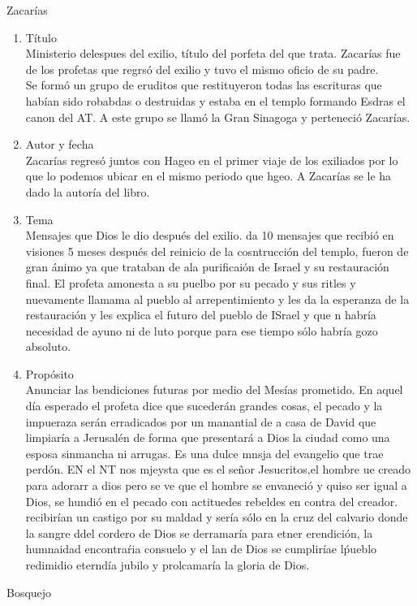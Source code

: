 \documentclass[12pt]{article}
\begin{document}
\begin{section}{Zacarías}
	\begin{enumerate}
		\item Título\\
			Ministerio delespues del exilio, título del porfeta del que trata. Zacarías fue de los profetas que regrsó del exilio y tuvo el mismo oficio de su padre.\\
			Se formó un grupo de eruditos que restituyeron todas las escrituras que habían sido robabdas o destruidas y estaba en el templo formando Esdras el canon del AT. A este grupo se llamó la Gran Sinagoga y perteneció Zacarías.
		\item Autor y fecha\\
			Zacarías regresó juntos con Hageo en el primer viaje de los exiliados por lo que lo podemos ubicar en el mismo periodo que hgeo. A Zacarías se le ha dado la autoría del libro.
		\item Tema\\
			Mensajes que Dios le dio después del exilio. da 10 mensajes que recibió en visiones 5 meses después del reinicio de la cosntrucción del templo, fueron de gran ánimo ya que trataban de ala purificaión de Israel y su restauración final. El profeta amonesta a su puelbo por su pecado y sus ritles y nuevamente llamama al pueblo al arrepentimiento y les da la esperanza de la restauración y les explica el futuro del pueblo de ISrael y que n habría necesidad de ayuno ni de luto porque para ese tiempo sólo habría gozo absoluto. 
		\item Propósito\\
			Anunciar las bendiciones futuras por medio del Mesías prometido. En aquel día esperado el profeta dice que sucederán grandes cosas, el pecado y la impueraza serán erradicados por un manantial de a casa de David que limpiaría a Jerusalén de forma que presentará  a Dios la ciudad como una esposa sinmancha ni arrugas. Es una dulce mnsja del evangelio que trae perdón. EN el NT nos mjeysta que es el señor Jesucritos,el hombre ue creado para adorarr a dios pero se ve que el hombre se envaneció y quiso ser igual a Dios, se hundió en el pecado con actituedes rebeldes en contra del creador. recibirían un castigo por su maldad y sería sólo en la cruz del calvario donde la sangre ddel cordero de Dios se derramaría para etner erendición, la humnaidad encontraŕia consuelo y el lan de Dios se cumpliríae lṕueblo redimidio eterndía jubilo y prolcamaría la gloria de Dios.
	\end{enumerate}
	\begin{subsection}{Bosquejo}

\end{subsection}
\end{section}
\end{document}
